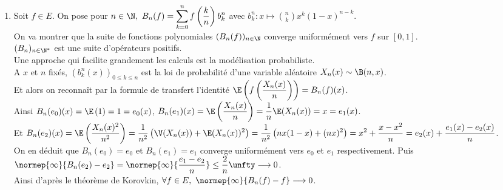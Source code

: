 \documentclass{book}
\begin{document}
\begin{enumerate}[leftmargin=*]
\begin{align*}
		\end{align*}
		Ceci étant vrai pour tout $x\in [0,1],\ |u_n(f)-f|\leq \varepsilon\normep{\infty}{u_n(e_0)}+c(e_2u_n(e_0)-2e_1u_n(e_1)+u_n(e_2))+\normep{\infty}{f}\normep{\infty}{u_n(e_0)-e_0}$.\\
		D'où $\normep{\infty}{u_n(f)-f}\leq \varepsilon\normep{\infty}{u_n(e_0)}+c\normep{\infty}{e_2u_n(e_0)-2e_1u_n(e_1)+u_n(e_2)}+\normep{\infty}{f}\normep{\infty}{u_n(e_0)-e_0}$.\\
		Or $\unfty\lim\normep{\infty}{u_n(e_0)}=\normep{\infty}{e_0}=1,\ \unfty\lim\normep{\infty}{e_2u_n(e_0)-2e_1u_n(e_1)+u_n(e_2)}=\normep{\infty}{e_2-2e_1^2+e_2}=0$ et $\unfty\lim\normep{\infty}{u_n(e_0)-e_0}=0$.\\
		Donc pour $N$ assez grand, $\forall n\geq N,\ \normep{\infty}{u_n(f)-f}\leq \varepsilon(1-\varepsilon)+c\varepsilon+\normep{\infty}{f}\varepsilon\underset{\varepsilon\to 0}{\longrightarrow} 0$.\\
		i.e $\normep{\infty}{u_n(f)-f}\unfty\longrightarrow 0$.
		\item Soit $f\in E$. On pose pour $n\in \N,\ B_n(f)=\displaystyle\sum_{k=0}^nf\left(\frac{k}{n}\right)b_k^n$ avec $b_k^n:x\mapsto \displaystyle\binom{n}{k}x^k(1-x)^{n-k}$.\\
		On va montrer que la suite de fonctions polynomiales $(B_n(f))_{n\in \N}$ converge uniformément vers $f$ sur $[0,1]$.\\
		$(B_n)_{n\in \N^*}$ est une suite d'opérateurs positifs.\\
		Une approche qui facilite grandement les calculs est la modélisation probabiliste.\\
		A $x$ et $n$ fixés, $(b_k^n(x))_{0\leq k\leq n}$ est la loi de probabilité d'une variable aléatoire $X_n(x)\sim \B(n,x)$.\\
		Et alors on reconnaît par la formule de transfert l'identité $\E\left(f\left(\dfrac{X_n(x)}{n}\right)\right)=B_n(f)(x)$.\\
		Ainsi $B_n(e_0)(x)=\E\left(1\right)=1=e_0(x)$, $B_n(e_1)(x)=\displaystyle\E\left(\frac{X_n(x)}{n}\right)=\frac{1}{n}\E(X_n(x))=x=e_1(x)$.\\
		Et $B_n(e_2)(x)=\displaystyle\E\left(\frac{X_n(x)^2}{n^2}\right)=\frac{1}{n^2}\left(\V(X_n(x))+\E(X_n(x))^2\right)=\frac{1}{n^2}\left(nx(1-x)+(nx)^2\right)=x^2+\frac{x-x^2}{n}=e_2(x)+\frac{e_1(x)-e_2(x)}{n}$.\\
		On en déduit que $B_n(e_0)=e_0$ et $B_n(e_1)=e_1$ converge uniformément vers $e_0$ et $e_1$ respectivement. Puis $\normep{\infty}{B_n(e_2)-e_2}=\normep{\infty}{\dfrac{e_1-e_2}{n}}\leq \dfrac{2}{n}\unfty\longrightarrow 0$.\\
		Ainsi d'après le théorème de Korovkin, $\forall f\in E,\ \normep{\infty}{B_n(f)-f}\longrightarrow 0$.
	\end{enumerate}
	
\end{document}
